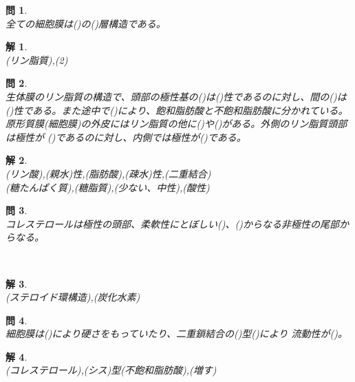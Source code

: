 \documentclass{jsarticle}
\newtheorem{pro}{問}[section]
\newtheorem{ans}{解}[section]
\begin{document}
\begin{pro}~\\
    全ての細胞膜は(\hspace{5mm})の(\hspace{2mm})層構造である。
\end{pro}
\begin{ans}~\\
    (リン脂質),(2)
\end{ans}

\begin{pro}~\\
    生体膜のリン脂質の構造で、頭部の極性基の(\hspace{5mm})は(\hspace{5mm})性であるのに対し、間の(\hspace{5mm})は
    (\hspace{5mm})性である。また途中で(\hspace{5mm})により、飽和脂肪酸と不飽和脂肪酸に分かれている。\\
    原形質膜(細胞膜)の外皮にはリン脂質の他に(\hspace{5mm})や(\hspace{5mm})がある。外側のリン脂質頭部は極性が
    (\hspace{5mm})であるのに対し、内側では極性が(\hspace{5mm})である。
\end{pro}
\begin{ans}~\\
    (リン酸),(親水)性,(脂肪酸),(疎水)性,(二重結合)\\
    (糖たんぱく質),(糖脂質),(少ない、中性),(酸性)
\end{ans}

\begin{pro}~\\
    コレステロールは極性の頭部、柔軟性にとぼしい(\hspace{5mm})、(\hspace{5mm})からなる非極性の尾部からなる。
\end{pro}~\\
\begin{ans}~\\
    (ステロイド環構造),(炭化水素)
\end{ans}

\begin{pro}~\\
    細胞膜は(\hspace{5mm})により硬さをもっていたり、二重鎖結合の(\hspace{5mm})型(\hspace{5mm})により
    流動性が(\hspace{5mm})。
\end{pro}
\begin{ans}~\\
    (コレステロール),(シス)型(不飽和脂肪酸),(増す)
\end{ans}
\end{document}
